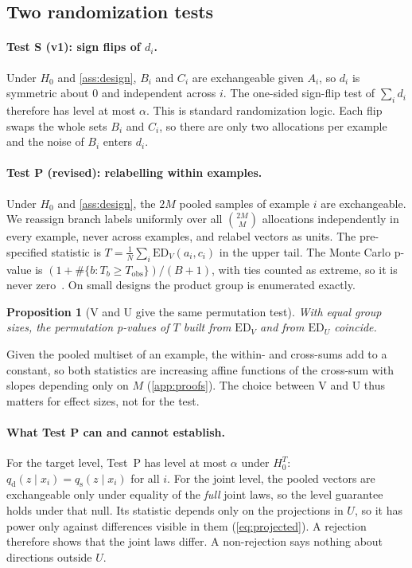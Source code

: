\documentclass{article}
\theoremstyle{plain}
\newtheorem{proposition}[theorem]{Proposition}
\theoremstyle{definition}
\theoremstyle{remark}
\newcommand{\ED}{\mathrm{ED}}
\newcommand{\qd}{q_{\mathrm{d}}}
\newcommand{\qs}{q_{\mathrm{s}}}
\begin{document}
\subsection{Two randomization tests}
\label{sec:tests}

\paragraph{Test S (v1): sign flips of $d_i$.}
Under $H_0$ and \cref{ass:design}, $B_i$ and $C_i$ are exchangeable given $A_i$, so $d_i$ is symmetric about $0$ and independent across $i$.
The one-sided sign-flip test of $\sum_i d_i$ therefore has level at most $\alpha$.
This is standard randomization logic. Each flip swaps the whole sets $B_i$ and $C_i$, so there are only two allocations per example and the noise of $B_i$ enters $d_i$.

\paragraph{Test P (revised): relabelling within examples.}
Under $H_0$ and \cref{ass:design}, the $2M$ pooled samples of example $i$ are exchangeable.
We reassign branch labels uniformly over all $\binom{2M}{M}$ allocations independently in every example, never across examples, and relabel vectors as units.
The pre-specified statistic is $T=\frac1N\sum_i\ED_V(a_i,c_i)$ in the upper tail.
The Monte Carlo p-value is $(1+\#\{b:T_b\ge T_{\mathrm{obs}}\})/(B+1)$, with ties counted as extreme, so it is never zero~\citep{phipson2010permutation}. On small designs the product group is enumerated exactly.
\begin{proposition}[V and U give the same permutation test]
\label{prop:vu}
With equal group sizes, the permutation p-values of $T$ built from $\ED_V$ and from $\ED_U$ coincide.
\end{proposition}
Given the pooled multiset of an example, the within- and cross-sums add to a constant, so both statistics are increasing affine functions of the cross-sum with slopes depending only on $M$ (\cref{app:proofs}).
The choice between V and U thus matters for effect sizes, not for the test.

\paragraph{What Test P can and cannot establish.}
For the target level, Test~P has level at most $\alpha$ under $H_0^T$: $\qd(z\mid x_i)=\qs(z\mid x_i)$ for all $i$.
For the joint level, the pooled vectors are exchangeable only under equality of the \emph{full} joint laws, so the level guarantee holds under that null. Its statistic depends only on the projections in $U$, so it has power only against differences visible in them (\cref{eq:projected}).
A rejection therefore shows that the joint laws differ. A non-rejection says nothing about directions outside $U$.
\end{document}

